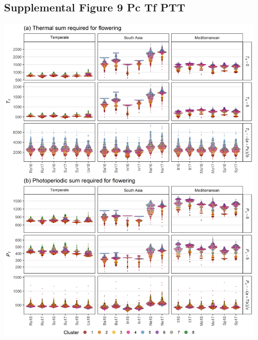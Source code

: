\documentclass[
]{article}
\begin{document}
\hypertarget{supplemental-figure-9-pc-tf-ptt}{%
\subsection{Supplemental Figure 9 Pc Tf
PTT}\label{supplemental-figure-9-pc-tf-ptt}}

\includegraphics{Supplemental_Figure_09.png}
\end{document}
